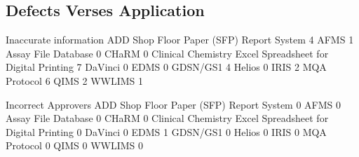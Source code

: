 \documentclass{article}
\begin{document}
\subsection{Defects Verses Application}

\begin{Schunk}
\begin{Soutput}
                                                            Inaccurate information
  ADD Shop Floor Paper (SFP) Report System                                       4
  AFMS                                                                           1
  Assay File Database                                                            0
  CHaRM                                                                          0
  Clinical Chemistry Excel Spreadsheet for Digital Printing                      7
  DaVinci                                                                        0
  EDMS                                                                           0
  GDSN/GS1                                                                       4
  Helios                                                                         0
  IRIS                                                                           2
  MQA Protocol                                                                   6
  QIMS                                                                           2
  WWLIMS                                                                         1
                                                           
                                                            Incorrect Approvers
  ADD Shop Floor Paper (SFP) Report System                                    0
  AFMS                                                                        0
  Assay File Database                                                         0
  CHaRM                                                                       0
  Clinical Chemistry Excel Spreadsheet for Digital Printing                   0
  DaVinci                                                                     0
  EDMS                                                                        1
  GDSN/GS1                                                                    0
  Helios                                                                      0
  IRIS                                                                        0
  MQA Protocol                                                                0
  QIMS                                                                        0
  WWLIMS                                                                      0
                                                           

\end{Soutput}
\end{Schunk}
\end{document}
